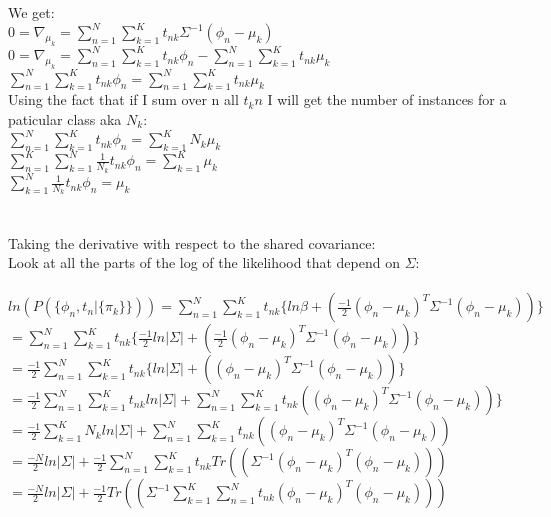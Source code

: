 \documentclass[11pt,leqno,fleqn]{article}
\begin{document}
We get:\\
$ 0  = \nabla_{\mu_k} =  \sum_{n=1}^N \sum_{k =1}^K {t_{nk}} \Sigma^{-1} (\phi_n - \mu_k) $\\
$0 = \nabla_{\mu_k} =  \sum_{n=1}^N \sum_{k =1}^K {t_{nk}}  \phi_n - \sum_{n=1}^N \sum_{k =1}^K {t_{nk}} \mu_k $\\
$\sum_{n=1}^N \sum_{k =1}^K {t_{nk}}  \phi_n =  \sum_{n=1}^N \sum_{k =1}^K {t_{nk}} \mu_k $\\
Using the fact that if I sum over n all $t_kn$ I will get the number of instances for a paticular class aka $N_k$:\\
$\sum_{n=1}^N \sum_{k =1}^K {t_{nk}}  \phi_n =  \sum_{k =1}^K N_k \mu_k $\\
$\sum_{n=1}^K \sum_{k =1}^N  \frac{1}{N_k} {t_{nk}}  \phi_n =  \sum_{k =1}^K  \mu_k $\\
$ \sum_{k =1}^N  \frac{1}{N_k} {t_{nk}}  \phi_n =   \mu_k $\\
\\
\\
Taking the derivative with respect to the shared covariance:\\
Look at all the parts of the log of the likelihood that depend on $\Sigma$:\\
\\
$ln(P(\{ \phi_n, t_n| \{ \pi_k \}\})) = \sum_{n=1}^N \sum_{k =1}^K {t_{nk}} \{   ln \beta + (\frac{-1}{2}(\phi_n - \mu_k)^T\Sigma^{-1}(\phi_n - \mu_k)) \}$\\
$ = \sum_{n=1}^N \sum_{k =1}^K {t_{nk}} \{  \frac{-1}{2} ln|\Sigma| + (\frac{-1}{2}(\phi_n - \mu_k)^T\Sigma^{-1}(\phi_n - \mu_k)) \}$\\
$ =  \frac{-1}{2} \sum_{n=1}^N \sum_{k =1}^K {t_{nk}} \{   ln|\Sigma| + ((\phi_n - \mu_k)^T\Sigma^{-1}(\phi_n - \mu_k)) \}$\\
$ =  \frac{-1}{2} \sum_{n=1}^N \sum_{k =1}^K {t_{nk}}  ln|\Sigma| + \sum_{n=1}^N \sum_{k =1}^K {t_{nk}} ((\phi_n - \mu_k)^T\Sigma^{-1}(\phi_n - \mu_k)) \}$\\
$ =  \frac{-1}{2}  \sum_{k =1}^K  N_k ln|\Sigma| + \sum_{n=1}^N \sum_{k =1}^K {t_{nk}} ((\phi_n - \mu_k)^T\Sigma^{-1}(\phi_n - \mu_k)) $\\
$ =  \frac{-N}{2}   ln|\Sigma| +  \frac{-1}{2}  \sum_{n=1}^N \sum_{k =1}^K {t_{nk}} Tr(( \Sigma^{-1}(\phi_n - \mu_k)^T(\phi_n - \mu_k))) $\\
$ =  \frac{-N}{2}  ln|\Sigma| +  \frac{-1}{2}   Tr(( \Sigma^{-1}   \sum_{k =1}^K  \sum_{n=1}^N  {t_{nk}} (\phi_n - \mu_k)^T(\phi_n - \mu_k))) $\\
\end{document}
